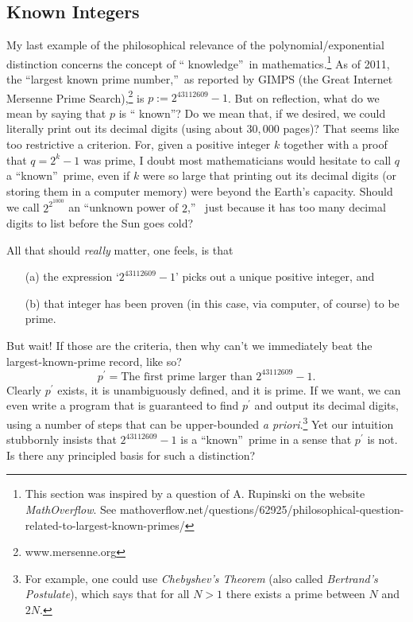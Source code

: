 \documentclass[12pt,onecolumn]{article}%
\begin{document}
\subsection{Known Integers\label{INTEGERS}}

My last example of the philosophical relevance of the polynomial/exponential
distinction concerns the concept of \textquotedblleft
knowledge\textquotedblright\  in mathematics.\footnote{This section was
inspired by a question of A. Rupinski on the website \textit{MathOverflow}.
 See
mathoverflow.net/questions/62925/philosophical-question-related-to-largest-known-primes/}
 As of 2011, the \textquotedblleft largest known prime
number,\textquotedblright\  as reported by GIMPS (the Great Internet Mersenne
Prime Search),\footnote{www.mersenne.org} is $p:=2^{43112609}-1$. But on
reflection, what do we mean by saying that $p$ is \textquotedblleft
known\textquotedblright? Do we mean that, if we desired, we could literally
print out its decimal digits (using about $30,000$ pages)? That seems like
too restrictive a criterion. For, given a positive integer $k$ together with
a proof that $q=2^{k}-1$ was prime, I doubt most mathematicians would
hesitate to call $q$ a \textquotedblleft known\textquotedblright\  prime, even
if $k$ were so large that printing out its decimal digits (or storing them in
a computer memory) were beyond the Earth's capacity. Should we call
$2^{2^{1000}}$ an \textquotedblleft unknown power of $2$,\textquotedblright\ %
 just because it has too many decimal digits to list before the Sun goes cold?

All that should \textit{really} matter, one feels, is that

\begin{enumerate}
\item[(a)] the expression `$2^{43112609}-1$' picks out a unique positive
integer, and

\item[(b)] that integer has been proven (in this case, via computer, of
course) to be prime.
\end{enumerate}

But wait! If those are the criteria, then why can't we immediately beat the
largest-known-prime record, like so?%
\[
p^{\prime}=\text{The first prime larger than }2^{43112609}-1.
\]
Clearly $p^{\prime}$ exists, it is unambiguously defined, and it is prime.
 If we want, we can even write a program that is guaranteed to find
$p^{\prime}$ and output its decimal digits, using a number of steps that can
be upper-bounded \textit{a priori}.\footnote{For example, one could use
\textit{Chebyshev's Theorem} (also called \textit{Bertrand's Postulate}),
which says that for all $N>1$ there exists a prime between $N$ and $2N$.}
 Yet our intuition stubbornly insists that $2^{43112609}-1$ is a
\textquotedblleft known\textquotedblright\  prime in a sense that $p^{\prime}$
is not. Is there any principled basis for such a distinction?
\end{document}
